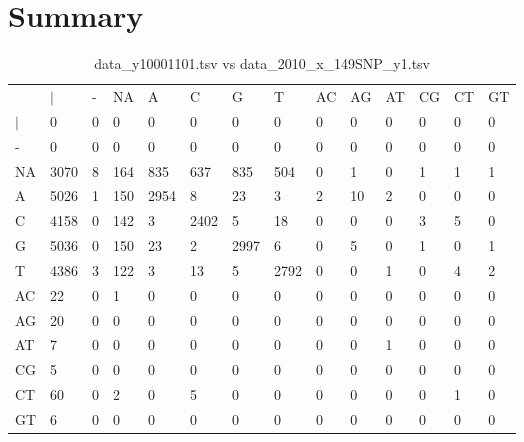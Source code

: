 \section{Summary} \label{section_summary}
\begin{center}
\begin{longtable}{|l|l|l|l|l|l|l|l|l|l|l|l|l|l|}
\caption{data\_y10001101.tsv vs data\_2010\_x\_149SNP\_y1.tsv} \label{table_dm0}\\
\hline
\\
\hline
&$|$&-&NA&A&C&G&T&AC&AG&AT&CG&CT&GT\\
$|$&0&0&0&0&0&0&0&0&0&0&0&0&0\\
-&0&0&0&0&0&0&0&0&0&0&0&0&0\\
NA&3070&8&164&835&637&835&504&0&1&0&1&1&1\\
A&5026&1&150&2954&8&23&3&2&10&2&0&0&0\\
C&4158&0&142&3&2402&5&18&0&0&0&3&5&0\\
G&5036&0&150&23&2&2997&6&0&5&0&1&0&1\\
T&4386&3&122&3&13&5&2792&0&0&1&0&4&2\\
AC&22&0&1&0&0&0&0&0&0&0&0&0&0\\
AG&20&0&0&0&0&0&0&0&0&0&0&0&0\\
AT&7&0&0&0&0&0&0&0&0&1&0&0&0\\
CG&5&0&0&0&0&0&0&0&0&0&0&0&0\\
CT&60&0&2&0&5&0&0&0&0&0&0&1&0\\
GT&6&0&0&0&0&0&0&0&0&0&0&0&0\\
\hline
\end{longtable}
\end{center}

